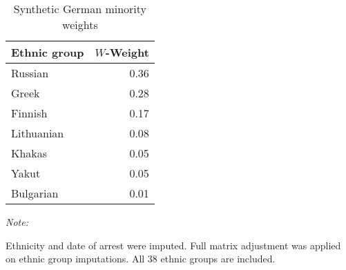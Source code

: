 \begin{table}[t]

\caption{\label{tab:sc_weights}Synthetic German minority weights}
\centering
\begin{threeparttable}
\begin{tabular}{lr}
\toprule
Ethnic group & $W$-Weight\\
\midrule
Russian & 0.36\\
Greek & 0.28\\
Finnish & 0.17\\
Lithuanian & 0.08\\
Khakas & 0.05\\
Yakut & 0.05\\
Bulgarian & 0.01\\
\bottomrule
\end{tabular}
\begin{tablenotes}
\item \textit{Note: } 
\item Ethnicity and date of arrest were imputed. Full matrix adjustment was applied on ethnic group imputations. All 38 ethnic groups are included.
\end{tablenotes}
\end{threeparttable}
\end{table}